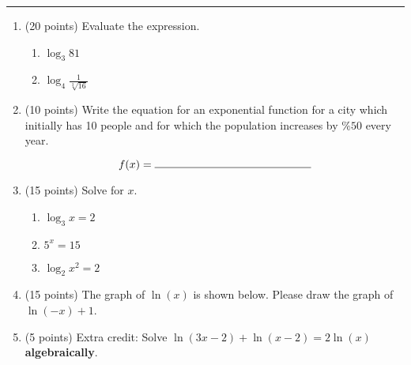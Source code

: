 \documentclass[11pt]{article}
\begin{document}
\Large


\medskip\hrule
\vspace{10pt}

\begin{enumerate}

\item (20 points) Evaluate the expression.
\begin{multicols}{2}
\begin{enumerate}
    \item $\log_{3}{81}$ \\
    \item $\log_{4}{\frac{1}{\sqrt[3]{16}}}$ \\
\end{enumerate}
\end{multicols}

\item (10 points) Write the equation for an exponential function for a city which initially has 10 people and for which the population increases by $\%50$ every year.

$$f(x) = \rule{5cm}{0.15mm}$$

\item (15 points) Solve for $x$.
\begin{multicols}{2}
\begin{enumerate}[itemsep=25pt]
    \item $\log_{3}{x} = 2$
    \item $5^x = 15$
    \item $\log_{2}{x^2} = 2 $
\end{enumerate}
\end{multicols}

\item (15 points) The graph of $\ln(x)$ is shown below. Please draw the graph of $\ln(-x) + 1$.
\\

\vspace{10pt}
\begin{center}
\end{center}

\item (5 points) Extra credit: Solve $\ln(3x-2)+\ln(x-2)=2\ln(x)$ \textbf{algebraically}.

\end{enumerate}
\end{document}
